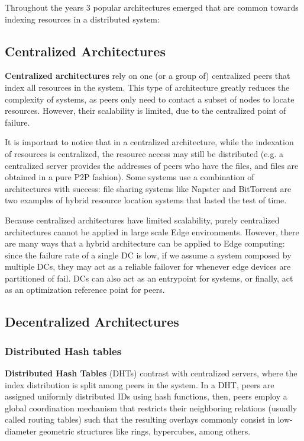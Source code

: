 Throughout the years 3 popular architectures emerged that are common towards indexing resources in a distributed system:

\subsection{Centralized Architectures}

\textbf{Centralized architectures} rely on one (or a group of) centralized peers that index all resources in the system. This type of architecture greatly reduces the complexity of systems, as peers only need to contact a subset of nodes to locate resources. However, their scalability is limited, due to the centralized point of failure. 

It is important to notice that in a centralized architecture, while the indexation of resources is centralized, the resource access may still be distributed (e.g. a centralized server provides the addresses of peers who have the files, and files are obtained in a pure P2P fashion). Some systems use a combination of architectures with success: file sharing systems like Napster and BitTorrent \cite{cohen2003incentives} are two examples of hybrid resource location systems that lasted the test of time. 

Because centralized architectures have limited scalability, purely centralized architectures cannot be applied in large scale Edge environments. However, there are many ways that a hybrid architecture can be applied to Edge computing: since the failure rate of a single DC is low, if we assume a system composed by multiple DCs, they may act as a reliable failover for whenever edge devices are partitioned of fail. DCs can also act as an entrypoint for systems, or finally, act as an optimization reference point for peers. 

\subsection{Decentralized Architectures}

\subsubsection{Distributed Hash tables}

\textbf{Distributed Hash Tables} (DHTs) contrast with centralized servers, where the index distribution is split among peers in the system. In a DHT, peers are assigned uniformly distributed IDs using hash functions, then, peers employ a global coordination mechanism that restricts their neighboring relations (usually called routing tables) such that the resulting overlays commonly consist in low-diameter geometric structures like rings, hypercubes, among others. %

